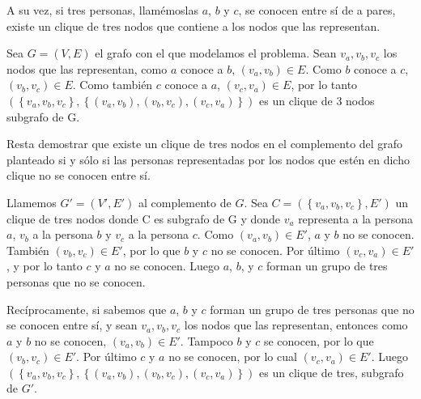 \documentclass[a4paper, 12pt]{article}
\begin{document}
A su vez, si tres personas, llam\'emoslas $a$, $b$ y $c$, se conocen entre s\'i de a pares, existe un clique de tres nodos que contiene a los nodos que las representan. 


Sea $ G = \left( V, E \right) $ el grafo con el que modelamos el problema. Sean $v_a, v_b, v_c$ los nodos que las representan, como $a$ conoce a $b$, $\left( v_a,v_b \right) \in E $. Como $b$ conoce a $c$, $ \left(v_b, v_c \right) \in E$. Como tambi\'en $c$ conoce a $a$, $ \left( v_c, v_a \right) \in E$, por lo tanto $\left( \left\lbrace v_a, v_b, v_c \right\rbrace, \left\lbrace  \left(v_a,v_b\right) , \left( v_b,v_c\right), \left( v_c, v_a\right) \right\rbrace\right)$ es un clique de 3 nodos subgrafo de G.


Resta demostrar que existe un clique de tres nodos en el complemento del grafo planteado si y s\'olo si las personas representadas por los nodos que est\'en en dicho clique no se conocen entre s\'i.


Llamemos $G' = \left( V', E' \right)$ al complemento de $G$.  Sea $ C = \left( \left\lbrace v_a, v_b,v_c \right\rbrace, E' \right) $ un clique de tres nodos donde C es subgrafo de G y donde $v_a$ representa a la persona $a$, $v_b$ a la persona $b$ y $v_c$ a la persona $c$. Como $\left( v_a,v_b\right) \in E'$, $a$ y $b$ no se conocen. Tambi\'en $\left( v_b,v_c\right) \in E'$, por lo que $b$ y $c$ no se conocen. Por \'ultimo $\left( v_c,v_a\right) \in E'$, y por lo tanto $c$ y $a$ no se conocen. Luego $a$, $b$, y $c$ forman un grupo de tres personas que no se conocen.



Rec\'iprocamente, si sabemos que $a$, $b$ y $c$ forman un grupo de tres personas que no se conocen entre s\'i, y sean $v_a, v_b, v_c$ los nodos que las representan, entonces como $a$ y $b$ no se conocen, $\left(v_a,v_b\right) \in E'$. Tampoco $b$ y $c$ se conocen, por lo que $\left(v_b,v_c\right) \in E'$. Por \'ultimo $c$ y $a$ no se conocen, por lo cual $\left(v_c,v_a\right) \in E'$. Luego $\left( \left\lbrace v_a, v_b, v_c \right\rbrace, \left\lbrace  \left(v_a,v_b\right) , \left( v_b,v_c\right), \left( v_c, v_a\right) \right\rbrace\right)$ es un clique de tres, subgrafo de $G'$.
\end{document}
